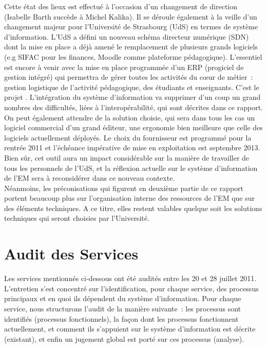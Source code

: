 \documentclass{book}
\begin{document}
Cette état des lieux est effectué à l'occasion d'un changement de direction
(Isabelle Barth succède à Michel Kalika). Il se déroule également à la veille
d'un changement majeur pour l'Université de Strasbourg (UdS) en termes de 
système d'information. L'UdS a défini un nouveau schéma directeur numérique
(SDN) dont la mise en place a déjà amené le remplacement de plusieurs grands
logiciels (e.g SIFAC pour les finances, Moodle comme plateforme pédagogique).
L'essentiel est encore à venir avec la mise en place programmée d'un ERP
(progiciel de gestion intégré) qui permettra de gérer toutes les activités
du c{\oe}ur de métier~: gestion logistique de l'activité pédagogique, des
étudiants et enseignants. C'est le projet . L'intégration
du système d'information va supprimer d'un coup un grand nombres des
difficultés, liées à l'interopérabilité, qui sont décrites dans ce rapport.
On peut également attendre de la solution choisie, qui sera dans tous les
cas un logiciel commercial d'un grand éditeur, une ergonomie bien meilleure
que celle des logiciels actuellement déployés.
Le choix du fournisseur est programmé pour la rentrée 2011 et l'échéance
impérative de mise en exploitation est septembre 2013.\\

Bien sûr, cet outil aura un impact considérable sur la manière de travailler
de tous les personnels de l'UdS, et la réflexion actuelle sur le système
d'information de l'EM sera à reconsidérer dans ce nouveau contexte.\\

Néanmoins, les préconisations qui figurent en deuxième partie de ce rapport
portent beaucoup plus sur l'organisation interne des ressources de l'EM
que sur des éléments techniques. A ce titre, elles restent valables
quelque soit les solutions techniques qui seront choisies par l'Université.


 

\chapter{Audit des Services}
 
Les services mentionnés ci-dessous ont été audités entre les 20 et 28 juillet 2011.
L'entretien s'est concentré sur l'identification, pour chaque service, des processus 
principaux et en quoi ils dépendent du système d'information. Pour chaque service,
nous structurons l'audit de la manière suivante~: les processus sont identifiés
(processus fonctionnels), la façon dont les processus fonctionnent actuellement, 
et comment ils s'appuient sur le système d'information est décrite (existant), 
et enfin un jugement global est porté sur ces processus (analyse).
\end{document}
